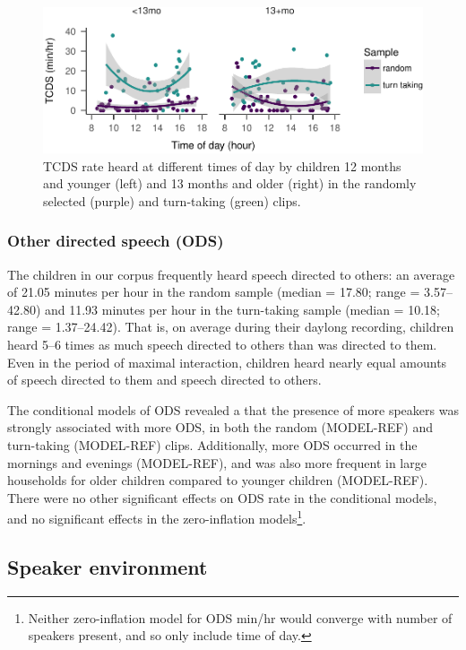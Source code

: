 \documentclass[floatsintext,man]{apa6}
\theoremstyle{definition}
\theoremstyle{definition}
\theoremstyle{definition}
\theoremstyle{remark}
\begin{document}
\begin{figure}
\centering
\includegraphics{Tseltal-CLE_files/figure-latex/fig2-1.pdf}
\caption{\label{fig:fig2}TCDS rate heard at different times of day by
children 12 months and younger (left) and 13 months and older (right) in
the randomly selected (purple) and turn-taking (green) clips.}
\end{figure}

\subsubsection{Other directed speech
(ODS)}\label{other-directed-speech-ods}

The children in our corpus frequently heard speech directed to others:
an average of 21.05 minutes per hour in the random sample (median =
17.80; range = 3.57--42.80) and 11.93 minutes per hour in the
turn-taking sample (median = 10.18; range = 1.37--24.42). That is, on
average during their daylong recording, children heard 5--6 times as
much speech directed to others than was directed to them. Even in the
period of maximal interaction, children heard nearly equal amounts of
speech directed to them and speech directed to others.

The conditional models of ODS revealed a that the presence of more
speakers was strongly associated with more ODS, in both the random
(MODEL-REF) and turn-taking (MODEL-REF) clips. Additionally, more ODS
occurred in the mornings and evenings (MODEL-REF), and was also more
frequent in large households for older children compared to younger
children (MODEL-REF). There were no other significant effects on ODS
rate in the conditional models, and no significant effects in the
zero-inflation
models\footnote{Neither zero-inflation model for ODS min/hr would converge with number of speakers present, and so only include time of day.}.

\subsection{Speaker environment}\label{speaker-environment}
\end{document}
